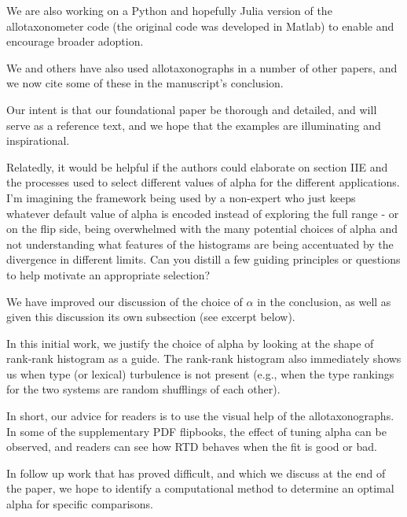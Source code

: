 We are also working on a Python and hopefully Julia version of the
allotaxonometer code (the original code was developed in Matlab) to
enable and encourage broader adoption.

We and others have also used allotaxonographs in a number of other
papers, and we now cite some of these in the manuscript's conclusion.

Our intent is that our foundational paper be thorough and detailed,
and will serve as a reference text, and we hope that the examples are illuminating
and inspirational.

\begin{reviewercomment}
  Relatedly, it would be helpful if the authors could elaborate on
  section IIE and the processes used to select different values of alpha
  for the different applications.  I'm imagining the framework being
  used by a non-expert who just keeps whatever default value of alpha is
  encoded instead of exploring the full range - or on the flip side,
  being overwhelmed with the many potential choices of alpha and not
  understanding what features of the histograms are being accentuated by
  the divergence in different limits. Can you distill a few guiding
  principles or questions to help motivate an appropriate selection?
\end{reviewercomment}

We have improved our discussion of the choice of $\alpha$ in the conclusion,
as well as given this discussion its own subsection (see excerpt below).

In this initial work, we justify the choice of alpha by looking at the shape of
rank-rank histogram as a guide.
The rank-rank histogram also immediately shows us when type (or lexical) turbulence is not
present (e.g., when the type rankings for the two systems are random shufflings of each other).

In short, our advice for readers is to use the visual help of the allotaxonographs.
In some of the supplementary PDF flipbooks, the effect of tuning alpha can be observed,
and readers can see how RTD behaves when the fit is good or bad.

In follow up work that has proved difficult, and which we discuss at the end of the paper, 
we  hope to identify a computational method to determine an optimal alpha for specific
comparisons.



